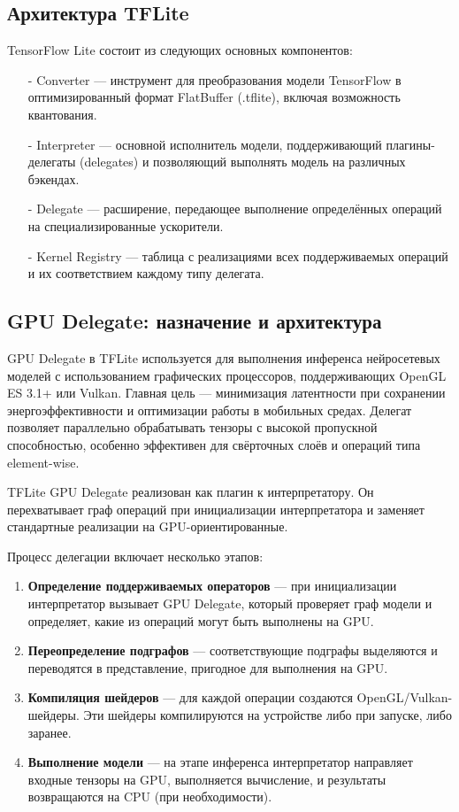 \documentclass[a4paper,14pt]{extreport}
\begin{document}
            \subsection{Архитектура TFLite}
            TensorFlow Lite состоит из следующих основных компонентов:
            \begin{itemize}
                \item[-] Converter — инструмент для преобразования модели TensorFlow в оптимизированный формат FlatBuffer (.tflite), включая возможность квантования.
                \item[-] Interpreter — основной исполнитель модели, поддерживающий плагины-делегаты (delegates) и позволяющий выполнять модель на различных бэкендах.
                \item[-] Delegate — расширение, передающее выполнение определённых операций на специализированные ускорители.
                \item[-] Kernel Registry — таблица с реализациями всех поддерживаемых операций и их соответствием каждому типу делегата.
            \end{itemize}
        
            \subsection{GPU Delegate: назначение и архитектура}
            GPU Delegate в TFLite используется для выполнения инференса нейросетевых моделей с использованием графических процессоров, поддерживающих OpenGL ES 3.1+ или Vulkan. Главная цель — минимизация латентности при сохранении энергоэффективности и оптимизации работы в мобильных средах. Делегат позволяет параллельно обрабатывать тензоры с высокой пропускной способностью, особенно эффективен для свёрточных слоёв и операций типа element-wise.
            
            TFLite GPU Delegate реализован как плагин к интерпретатору. Он перехватывает граф операций при инициализации интерпретатора и заменяет стандартные реализации на GPU-ориентированные.
        
            Процесс делегации включает несколько этапов:
            \begin{enumerate}
                \item \textbf{Определение поддерживаемых операторов} — при инициализации интерпретатор вызывает GPU Delegate, который проверяет граф модели и определяет, какие из операций могут быть выполнены на GPU.
                \item \textbf{Переопределение подграфов} — соответствующие подграфы выделяются и переводятся в представление, пригодное для выполнения на GPU.
                \item \textbf{Компиляция шейдеров} — для каждой операции создаются OpenGL/Vulkan-шейдеры. Эти шейдеры компилируются на устройстве либо при запуске, либо заранее.
                \item \textbf{Выполнение модели} — на этапе инференса интерпретатор направляет входные тензоры на GPU, выполняется вычисление, и результаты возвращаются на CPU (при необходимости).
            \end{enumerate}
        
\end{document}
